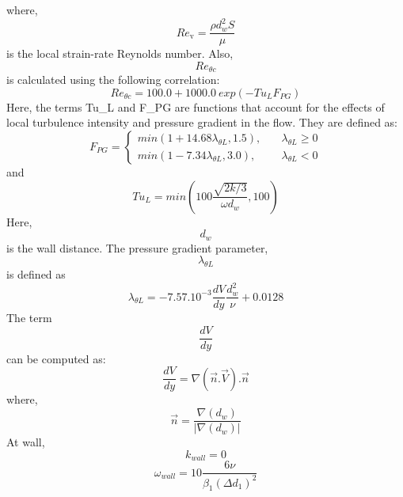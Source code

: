 where,
\begin{equation}
  Re_\text{v} = \frac{\rho d_w^2 S}{\mu}
\end{equation}
is the local strain-rate Reynolds number.
Also, 
\begin{equation}
Re_{\theta c}
\end{equation}
is calculated using the following correlation:
\begin{equation}
  Re_{\theta c} = 100.0 + 1000.0 ~exp(-Tu_L F_{PG})
\end{equation}
Here, the terms Tu_L and F_{PG} are  functions that
account for the effects of local turbulence intensity and pressure gradient in the flow.
They are defined as:
\begin{equation}
  F_{PG} = \left\{
    \begin{array}{ll}
      min(1 + 14.68\lambda_{\theta L}, 1.5) , &\quad\lambda_{\theta L} \geq 0\\
      min(1 - 7.34\lambda_{\theta L}, 3.0) , &\quad\lambda_{\theta L} < 0
    \end{array}\right.
\end{equation}
and
\begin{equation}
  Tu_L = min\left(100\frac{\sqrt{2k/3}}{\omega d_w}, 100\right)
\end{equation}
Here, 
\begin{equation}
d_w
\end{equation}
is the wall distance.
The pressure gradient  parameter, 
\begin{equation}
\lambda_{\theta L}
\end{equation}
is defined as 
\begin{equation}
  \lambda_{\theta L} = -7.57. 10^{-3}\frac{d V}{dy}\frac{d_w^2}{\nu} + 0.0128
\end{equation}
{The term 
\begin{equation}
\frac{dV}{dy}
\end{equation}
can be computed as:}
{
\begin{equation}
    \frac{dV}{dy} = \nabla (\vec{n}.\vec{V}).\vec{n}
\end{equation}
}
where, 
{
\begin{equation}
    \vec{n} = \frac{\nabla (d_w)}{|\nabla (d_w)|}
\end{equation}
}
At wall,
\begin{equation}
    k_{wall} = 0
\end{equation}
\begin{equation}
   \omega_{wall} = 10 \frac{6 \nu}{\beta_1 (\Delta d_1)^2}
\end{equation}
